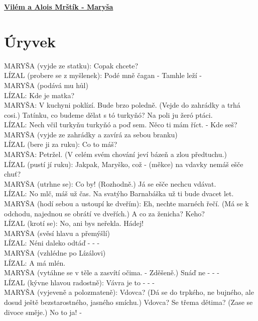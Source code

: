 \documentclass[11pt]{article}
\begin{document}
    \begin{center}
        \underline{\textbf{\Huge Vilém a Alois Mrštík - Maryša}}
    \end{center}
    \section*{Úryvek}
    MARYŠA (vyjde ze statku): Copak chcete?\\
    LÍZAL (probere se z myšlenek): Podé mně čagan - Tamhle leží -\\
    MARYŠA (podává mu hůl)\\
    LÍZAL: Kde je matka?\\
    MARYŠA: V kuchyni poklízí. Bude brzo poledně. (Vejde do zahrádky a trhá cosi.) Tatínku, co budeme dělat s tó turkyňó? Na poli ju žeró ptáci.\\
    LÍZAL: Nech včil turkyňu turkyňó a poď sem. Něco ti mám říct. - Kde seš?\\
    MARYŠA (vyjde ze zahrádky a zavírá za sebou branku)\\
    LÍZAL (bere ji za ruku): Co to máš?\\
    MARYŠA: Petržel. (V celém svém chování jeví bázeň a zlou předtuchu.)\\
    LÍZAL (pustí jí ruku): Jakpak, Maryško, což - (měkce) na vdavky nemáš ešče chuť?\\
    MARYŠA (utrhne se): Co by! (Rozhodně.) Já se ešče nechcu vdávat.\\
    LÍZAL: No mlč, máš už čas. Na svatýho Barnabáška už ti bude dvacet let.\\
    MARYŠA (hodí sebou a ustoupí ke dveřím): Eh, nechte marnéch řečí. (Má se k odchodu, najednou se obrátí ve dveřích.) A co za ženicha? Keho?\\
    LÍZAL (krotí se): No, ani bys neřekla. Hádej!\\
    MARYŠA (svěsí hlavu a přemýšlí)\\
    LÍZAL: Néni daleko odtáď - - -\\
    MARYŠA (vzhlédne po Lízálovi)\\
    LÍZAL: A má mlén.\\
    MARYŠA (vytáhne se v těle a zasvítí očima. - Zděšeně.) Snáď ne - - -\\
    LÍZAL (kývne hlavou radostně): Vávra je to - - -\\
    MARYŠA (vyjeveně a polozmateně): Vdovca? (Dá se do trpkého, ne bujného, ale dosud ještě bezstarostného, jasného smíchu.) Vdovca? Se třema dětima? (Zase se divoce směje.) No to ja! -\\
\end{document}
